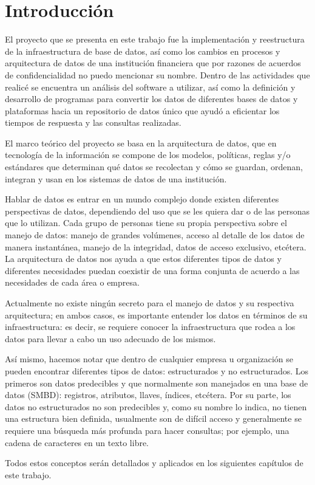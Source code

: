 \chapter{Introducción}
\label{cap:introduccion}

El proyecto que se presenta en este trabajo fue la implementación y reestructura
de la infraestructura de base de datos, así como los cambios en procesos y
arquitectura de datos de una institución financiera que por razones de acuerdos
de confidencialidad no puedo mencionar su nombre. Dentro de las actividades que
realicé se encuentra un análisis del software a utilizar, así como la definición
y desarrollo de programas para convertir los datos de diferentes bases de datos
y plataformas hacia un repositorio de datos único que ayudó a eficientar los
tiempos de respuesta y las consultas realizadas.

El marco teórico del proyecto se basa en la arquitectura de datos, que en
tecnología de la información se compone de los modelos, políticas, reglas y/o
estándares que determinan qué datos se recolectan y cómo se guardan, ordenan,
integran y usan en los sistemas de datos de una institución.

Hablar de datos es entrar en un mundo complejo donde existen diferentes
perspectivas de datos, dependiendo del uso que se les quiera dar o de las
personas que lo utilizan. Cada grupo de personas tiene su propia perspectiva
sobre el manejo de datos: manejo de grandes volúmenes, acceso al detalle de los
datos de manera instantánea, manejo de la integridad, datos de acceso exclusivo,
etcétera. La arquitectura de datos nos ayuda a que estos diferentes tipos de
datos y diferentes necesidades puedan coexistir de una forma conjunta de acuerdo
a las necesidades de cada área o empresa.

Actualmente no existe ningún secreto para el manejo de datos y su respectiva
arquitectura; en ambos casos, es importante entender los datos en términos de su
infraestructura: es decir, se requiere conocer la infraestructura que rodea a
los datos para llevar a cabo un uso adecuado de los mismos.

Así mismo, hacemos notar que dentro de cualquier empresa u organización se
pueden encontrar diferentes tipos de datos: estructurados y no
estructurados. Los primeros son datos predecibles y que normalmente son
manejados en una base de datos (SMBD): registros, atributos, llaves, índices,
etcétera. Por su parte, los datos no estructurados no son predecibles y, como su
nombre lo indica, no tienen una estructura bien definida, usualmente son de
difícil acceso y generalmente se requiere una búsqueda más profunda para hacer
consultas; por ejemplo, una cadena de caracteres en un texto libre.

Todos estos conceptos serán detallados y aplicados en los siguientes capítulos
de este trabajo.

\cleardoublepage

